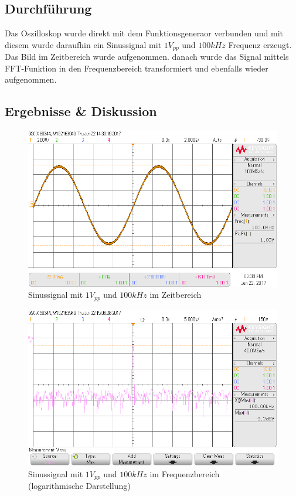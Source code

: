 \documentclass[12pt,a4paper,titlepage]{article}
\begin{document}
\subsection*{Durchf\"uhrung}
Das Oszilloskop wurde direkt mit dem Funktionsgeneraor verbunden und mit diesem wurde daraufhin ein Sinussignal mit $1 V_{pp}$ und $100kHz$ Frequenz erzeugt. Das Bild im Zeitbereich wurde aufgenommen. danach wurde das Signal mittels FFT-Funktion in den Frequenzbereich transformiert und ebenfalls wieder aufgenommen.

\subsection*{Ergebnisse \& Diskussion}
\begin{figure}[H]
  \centering
  \includegraphics[width=150mm]{scope_18.png}
  \caption{Sinussignal mit $1V_{pp}$ und $100kHz$ im Zeitbereich}
\end{figure}

\begin{figure}[H]
  \centering
  \includegraphics[width=150mm]{scope_36.png}
  \caption{Sinussignal mit $1V_{pp}$ und $100kHz$ im Frequenzbereich (logarithmische Darstellung)}
\end{figure}
\end{document}
